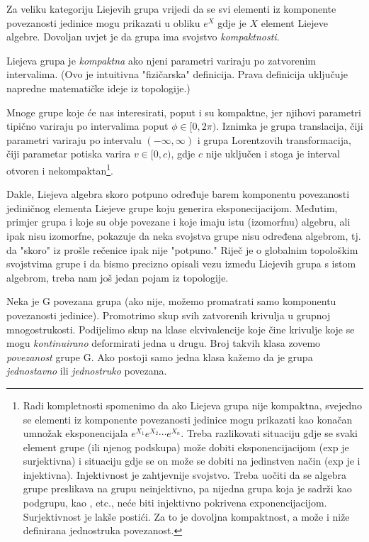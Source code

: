 Za veliku kategoriju Liejevih grupa vrijedi da se svi elementi iz 
komponente povezanosti jedinice mogu prikazati u obliku
$e^{X}$ gdje je $X$ element
Liejeve algebre. Dovoljan uvjet je da grupa ima svojstvo \emph{kompaktnosti}.
\begin{definicija}[Kompaktnost]
Liejeva grupa je \emph{kompaktna} ako njeni parametri variraju po zatvorenim intervalima.
(Ovo je intuitivna "fizičarska" definicija. Prava definicija uključuje napredne
matematičke ideje iz topologije.)
\label{def:kompaktnost}
\end{definicija}
Mnoge grupe koje će nas interesirati, poput
 i  su kompaktne, jer njihovi parametri tipično variraju
po intervalima poput $\phi \in [0, 2\pi)$. Iznimka je
grupa translacija, čiji parametri variraju po intervalu $(-\infty,
\infty)$ i grupa Lorentzovih transformacija, čiji parametar
potiska varira $v \in [0, c)$, gdje $c$ nije uključen i stoga
je interval otvoren i nekompaktan\footnote{Radi
    kompletnosti spomenimo da ako Liejeva grupa nije kompaktna, 
    svejedno se elementi iz komponente
povezanosti jedinice mogu prikazati kao konačan umnožak eksponencijala
$e^{X_1} e^{X_2}\cdots e^{X_n}$.
Treba razlikovati situaciju gdje se svaki element
grupe (ili njenog podskupa) može dobiti eksponencijacijom (exp
je surjektivna) i situaciju gdje se on može se dobiti na jedinstven način 
(exp je i injektivna).
Injektivnost je zahtjevnije svojstvo. 
Treba uočiti da se algebra grupe  preslikava na grupu neinjektivno,
pa nijedna grupa koja
je sadrži kao podgrupu, kao ,  etc., neće biti injektivno pokrivena
exponencijacijom. Surjektivnost je lakše postići.
Za to je dovoljna kompaktnost,
a može i niže definirana jednostruka povezanost.}.


Dakle, Liejeva algebra skoro potpuno određuje barem komponentu povezanosti
jediničnog elementa Liejeve grupe koju generira eksponecijacijom.
Međutim, primjer grupa  i  koje su obje povezane i koje
imaju istu (izomorfnu) algebru, ali ipak nisu izomorfne, pokazuje
da neka svojstva grupe nisu određena algebrom, tj. da "skoro" iz
prošle rečenice ipak nije "potpuno."
Riječ je o globalnim topološkim svojstvima grupe i
da bismo precizno opisali vezu između Liejevih grupa s istom algebrom, treba
nam još jedan pojam iz topologije.
\begin{definicija}
  Neka je G povezana grupa (ako nije, možemo promatrati samo komponentu
povezanosti jedinice). Promotrimo skup svih zatvorenih krivulja u grupnoj 
mnogostrukosti. Podijelimo skup  na klase ekvivalencije koje čine 
krivulje koje se mogu \emph{kontinuirano} deformirati jedna u drugu.
Broj takvih klasa zovemo \emph{povezanost} grupe G. Ako postoji samo
jedna klasa kažemo da je grupa \emph{jednostavno} ili \emph{jednostruko}
povezana.
\end{definicija}

